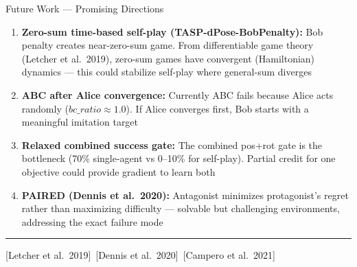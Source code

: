 \documentclass[aspectratio=169,xcolor=dvipsnames,t]{beamer}
\newcommand{\litfooter}[1]{%
  \vspace{2pt}%
  \hrule%
  \vspace{2pt}%
  {\tiny\color{LightDarkGrey} #1}%
}
\begin{document}
\begin{frame}[t]{Future Work — Promising Directions}
  \small
  \begin{enumerate}
    \item \textbf{Zero-sum time-based self-play (TASP-dPose-BobPenalty):} Bob penalty creates near-zero-sum game. From differentiable game theory (Letcher et al.\ 2019), zero-sum games have convergent (Hamiltonian) dynamics — this could stabilize self-play where general-sum diverges
    \item \textbf{ABC after Alice convergence:} Currently ABC fails because Alice acts randomly ($bc\_ratio \approx 1.0$). If Alice converges first, Bob starts with a meaningful imitation target
    \item \textbf{Relaxed combined success gate:} The combined pos+rot gate is the bottleneck (70\% single-agent vs 0–10\% for self-play). Partial credit for one objective could provide gradient to learn both
    \item \textbf{PAIRED (Dennis et al.\ 2020):} Antagonist minimizes protagonist's regret rather than maximizing difficulty — solvable but challenging environments, addressing the exact failure mode
  \end{enumerate}

  \vfill\litfooter{[Letcher et al.\ 2019]~[Dennis et al.\ 2020]~[Campero et al.\ 2021]}
\end{frame}

\end{document}
